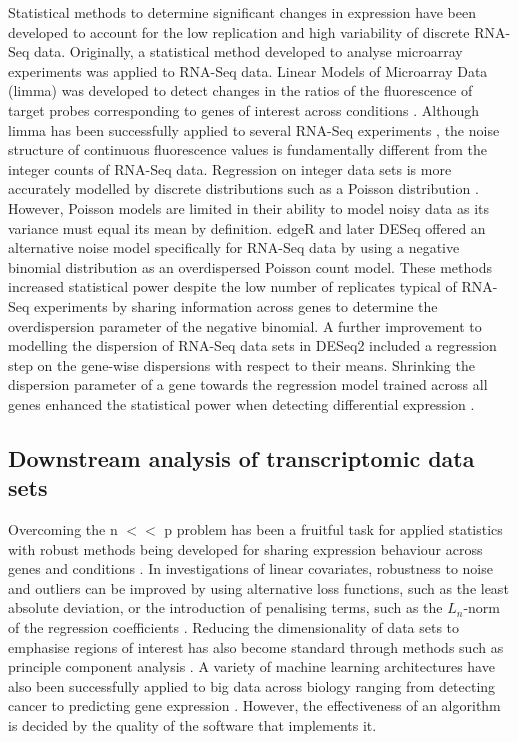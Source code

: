 \documentclass[../main.tex]{subfiles}
\begin{document}
Statistical methods to determine significant changes in expression have been developed to account for the low replication and high variability of discrete RNA-Seq data.
Originally, a statistical method developed to analyse microarray experiments was applied to RNA-Seq data.
Linear Models of Microarray Data (limma) was developed to detect changes in the ratios of the fluorescence of target probes corresponding to genes of interest across conditions \parencite{Smyth2005}.
Although limma has been successfully applied to several RNA-Seq experiments \parencite{Ritchie2015}, the noise structure of continuous fluorescence values is fundamentally different from the integer counts of RNA-Seq data.
Regression on integer data sets is more accurately modelled by discrete distributions such as a Poisson distribution \parencite{Cameron1998}.
However, Poisson models are limited in their ability to model noisy data as its variance must equal its mean by definition.
edgeR \parencite{Robinson2010} and later DESeq \parencite{Anders2010} offered an alternative noise model specifically for RNA-Seq data by using a negative binomial distribution as an overdispersed Poisson count model.
These methods increased statistical power despite the low number of replicates typical of RNA-Seq experiments by sharing information across genes to determine the overdispersion parameter of the negative binomial.
A further improvement to modelling the dispersion of RNA-Seq data sets in DESeq2 included a regression step on the gene-wise dispersions with respect to their means. 
Shrinking the dispersion parameter of a gene towards the regression model trained across all genes enhanced the statistical power when detecting differential expression \parencite{Love2014}.


\subsection{Downstream analysis of transcriptomic data sets}

Overcoming the n $<<$ p problem has been a fruitful task for applied statistics with robust methods being developed for sharing expression behaviour across genes and conditions \parencite{Gui2005}.
In investigations of linear covariates, robustness to noise and outliers can be improved by using alternative loss functions, such as the least absolute deviation, or the introduction of penalising terms, such as the $L_n$-norm of the regression coefficients \parencite{Wu2015}.
Reducing the dimensionality of data sets to emphasise regions of interest has also become standard through methods such as principle component analysis \parencite{Wall2005}.  
A variety of machine learning architectures have also been successfully applied to big data across biology ranging from detecting cancer to predicting gene expression \parencite{Xie2017, Liang2015, Tang2019}.
However, the effectiveness of an algorithm is decided by the quality of the software that implements it. 
\end{document}

